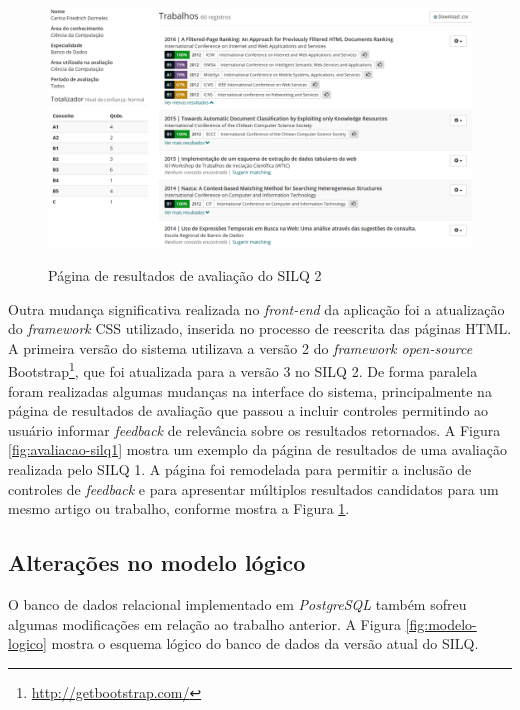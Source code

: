 \documentclass[12pt]{article}
\begin{document}
\begin{figure}[!h]
   \centering
   \caption{Página de resultados de avaliação do SILQ 2}
   \includegraphics[width=\textwidth]{../figuras/avaliacao-silq2.png}
   \label{fig:avaliacao-silq2}
\end{figure}


Outra mudança significativa realizada no \textit{front-end} da aplicação foi a atualização do \textit{framework} CSS utilizado, inserida no processo de reescrita das páginas HTML. A primeira versão do sistema utilizava a versão 2 do \textit{framework open-source} Bootstrap\footnote{\url{http://getbootstrap.com/}}, que foi atualizada para a versão 3 no SILQ 2. De forma paralela foram realizadas algumas mudanças na interface do sistema, principalmente na página de resultados de avaliação que passou a incluir controles permitindo ao usuário informar \textit{feedback} de relevância sobre os resultados retornados. A Figura \ref{fig:avaliacao-silq1} mostra um exemplo da página de resultados de uma avaliação realizada pelo SILQ 1. A página foi remodelada para permitir a inclusão de controles de \textit{feedback} e para apresentar múltiplos resultados candidatos para um mesmo artigo ou trabalho, conforme mostra a Figura \ref{fig:avaliacao-silq2}.

\subsection{Alterações no modelo lógico}

O banco de dados relacional implementado em \textit{PostgreSQL} também sofreu algumas modificações em relação ao trabalho anterior. A Figura \ref{fig:modelo-logico} mostra o esquema lógico do banco de dados da versão atual do SILQ.
\end{document}
